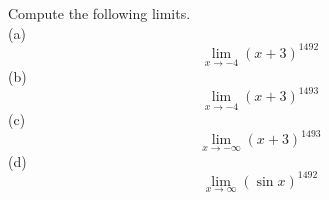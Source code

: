 Compute the following limits.\\
(a)
\begin{equation*}
  \lim_{x\rightarrow-4} (x+3)^{1492}
\end{equation*}
(b)
\begin{equation*}
  \lim_{x\rightarrow-4} (x+3)^{1493}
\end{equation*}
(c)
\begin{equation*}
  \lim_{x\rightarrow-\infty} (x+3)^{1493}
\end{equation*}
(d)
\begin{equation*}
  \lim_{x\rightarrow\infty} (\sin x)^{1492}
\end{equation*}
\answercheck
